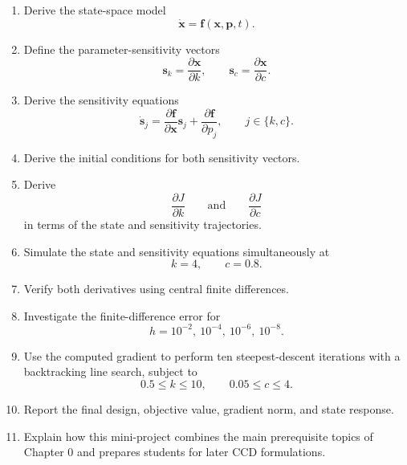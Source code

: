 \begin{enumerate}
    \item Derive the state-space model
    \begin{equation}
    \dot{\mathbf{x}}
    =
    \mathbf{f}
    \left(
    \mathbf{x},
    \mathbf{p},
    t
    \right).
    \end{equation}

    \item Define the parameter-sensitivity vectors
    \begin{equation}
    \mathbf{s}_k
    =
    \frac{\partial\mathbf{x}}{\partial k},
    \qquad
    \mathbf{s}_c
    =
    \frac{\partial\mathbf{x}}{\partial c}.
    \end{equation}

    \item Derive the sensitivity equations
    \begin{equation}
    \dot{\mathbf{s}}_j
    =
    \frac{\partial\mathbf{f}}{\partial\mathbf{x}}
    \mathbf{s}_j
    +
    \frac{\partial\mathbf{f}}{\partial p_j},
    \qquad
    j\in\{k,c\}.
    \end{equation}

    \item Derive the initial conditions for both sensitivity vectors.

    \item Derive
    \begin{equation}
    \frac{\partial J}{\partial k}
    \qquad\text{and}\qquad
    \frac{\partial J}{\partial c}
    \end{equation}
    in terms of the state and sensitivity trajectories.

    \item Simulate the state and sensitivity equations simultaneously at
    \begin{equation}
    k=4,
    \qquad
    c=0.8.
    \end{equation}

    \item Verify both derivatives using central finite differences.

    \item Investigate the finite-difference error for
    \begin{equation}
    h=10^{-2},\ 10^{-4},\ 10^{-6},\ 10^{-8}.
    \end{equation}

    \item Use the computed gradient to perform ten steepest-descent
    iterations with a backtracking line search, subject to
    \begin{equation}
    0.5\leq k\leq10,
    \qquad
    0.05\leq c\leq4.
    \end{equation}

    \item Report the final design, objective value, gradient norm, and state
    response.

    \item Explain how this mini-project combines the main prerequisite topics
    of Chapter 0 and prepares students for later CCD formulations.
\end{enumerate}
